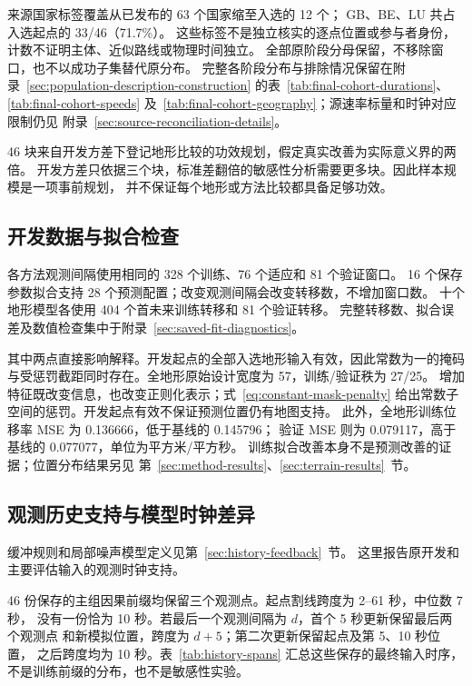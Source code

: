\documentclass[UTF8,11pt]{ctexart}
\begin{document}
来源国家标签覆盖从已发布的 63 个国家缩至入选的 12 个；
GB、BE、LU 共占入选起点的 33/46（71.7\%）。
这些标签不是独立核实的逐点位置或参与者身份，计数不证明主体、近似路线或物理时间独立。
全部原阶段分母保留，不移除窗口，也不以成功子集替代原分布。
完整各阶段分布与排除情况保留在附录~\ref{sec:population-description-construction}
的表~\ref{tab:final-cohort-durations}、\ref{tab:final-cohort-speeds}
及~\ref{tab:final-cohort-geography}；源速率标量和时钟对应限制仍见
附录~\ref{sec:source-reconciliation-details}。

46 块来自开发方差下登记地形比较的功效规划，假定真实改善为实际意义界的两倍。
开发方差只依据三个块，标准差翻倍的敏感性分析需要更多块。因此样本规模是一项事前规划，
并不保证每个地形或方法比较都具备足够功效。

\subsection{开发数据与拟合检查}
\label{sec:development-fit-summary}
各方法观测间隔使用相同的 328 个训练、76 个适应和 81 个验证窗口。
16 个保存参数拟合支持 28 个预测配置；改变观测间隔会改变转移数，不增加窗口数。
十个地形模型各使用 404 个首未来训练转移和 81 个验证转移。
完整转移数、拟合误差及数值检查集中于附录~\ref{sec:saved-fit-diagnostics}。

其中两点直接影响解释。开发起点的全部入选地形输入有效，因此常数为一的掩码
与受惩罚截距同时存在。全地形原始设计宽度为 57，训练/验证秩为 27/25。
增加特征既改变信息，也改变正则化表示；式~\eqref{eq:constant-mask-penalty}
给出常数子空间的惩罚。开发起点有效不保证预测位置仍有地图支持。
此外，全地形训练位移率 MSE 为 0.136666，低于基线的 0.145796；
验证 MSE 则为 0.079117，高于基线的 0.077077，单位为平方米/平方秒。
训练拟合改善本身不是预测改善的证据；位置分布结果另见
第~\ref{sec:method-results}、\ref{sec:terrain-results}~节。

\subsection{观测历史支持与模型时钟差异}
\label{sec:empirical-history-timings}
缓冲规则和局部噪声模型定义见第~\ref{sec:history-feedback}~节。
这里报告原开发和主要评估输入的观测时钟支持。

46 份保存的主组因果前缀均保留三个观测点。起点割线跨度为 2--61 秒，中位数 7 秒，
没有一份恰为 10 秒。若最后一个观测间隔为 \(d\)，首个 5 秒更新保留最后两个观测点
和新模拟位置，跨度为 \(d+5\)；第二次更新保留起点及第 5、10 秒位置，
之后跨度均为 10 秒。表~\ref{tab:history-spans} 汇总这些保存的最终输入时序，
不是训练前缀的分布，也不是敏感性实验。
\end{document}
